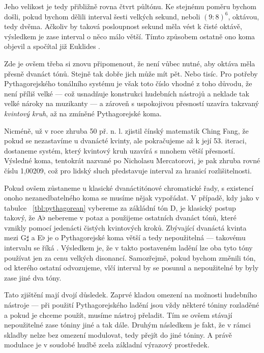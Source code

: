 \documentclass[12pt]{article}
\begin{document}
Jeho velikost je tedy přibližně rovna čtvrt půltónu. Ke stejnému poměru bychom došli, pokud bychom dělili interval šesti velkých sekund, neboli $(9 : 8)^6$, oktávou, tedy dvěma. Ačkoliv by taková posloupnost sekund měla vést k čisté oktávě, výsledkem je zase interval o něco málo větší. Tímto způsobem ostatně ono koma objevil a spočítal již Euklides \cite{barker}.

Zde je ovšem třeba si znovu připomenout, že není vůbec nutné, aby oktáva měla přesně dvanáct tónů. Stejně tak dobře jich může mít pět. Nebo tisíc. Pro potřeby Pythagorejského tonálního systému je však toto číslo vhodné z toho důvodu, že není příliš velké — což usnadňuje konstrukci hudebních nástrojů a neklade tak velké nároky na muzikanty — a zároveň s uspokojivou přesností uzavíra takzvaný \emph{kvintový kruh}, až na zmíněné Pythagorejské koma.

Nicméně, už v roce zhruba 50 př. n. l. zjistil čínský matematik Ching Fang, že pokud se nezastavíme u dvanácté kvinty, ale pokračujeme až k její 53. iteraci, dostaneme systém, který kvintový kruh uzavírá s mnohem větší přesností. Výsledné koma, tentokrát nazvané po Nicholasu Mercatorovi, je pak zhruba rovné číslu 1,00209, což pro lidský sluch představuje interval za hranicí rozlišitelnosti.

Pokud ovšem zůstaneme u klasické dvanáctitónové chromatické řady, s existencí onoho nezanedbatelného koma se musíme nějak vypořádat. V případě, kdy jako v tabulce ~\ref{tbl:pythagorean} vybereme za zákládní tón D, je klasický postup takový, že A$\flat$ nebereme v potaz a použijeme ostatních dvanáct tónů, které vznikly pomocí jedenácti čistých kvintových kroků. Zbývající dvanáctá kvinta mezi G$\sharp$ a E$\flat$ je o Pythagorejské koma větší a tedy nepoužitelná — takovému intervalu se říká . Výsledkem je, že v takto postaveném ladění lze oba tyto tóny používat jen za cenu velkých disonancí. Samozřejmě, pokud bychom změnili tón, od kterého ostatní odvozujeme, vlčí interval by se posunul a nepoužitelné by byly zase jiné dva tóny.

Tato zjištění mají dvojí důsledek. Zaprvé kladou omezení na možnosti hudebního nástroje — při použití Pythagorejského ladění jsou vždy některé tóniny rozladěné a pokud je chceme použít, musíme nástroj přeladit. Tím se ovšem stávají nepoužitelné zase tóniny jiné a tak dále. Druhým následkem je fakt, že v rámci skladby nelze bez omezení modulovat, tedy přejít do jiné tóniny. A právě modulace je v soudobé hudbě zcela základní výrazový prostředek.
\end{document}
